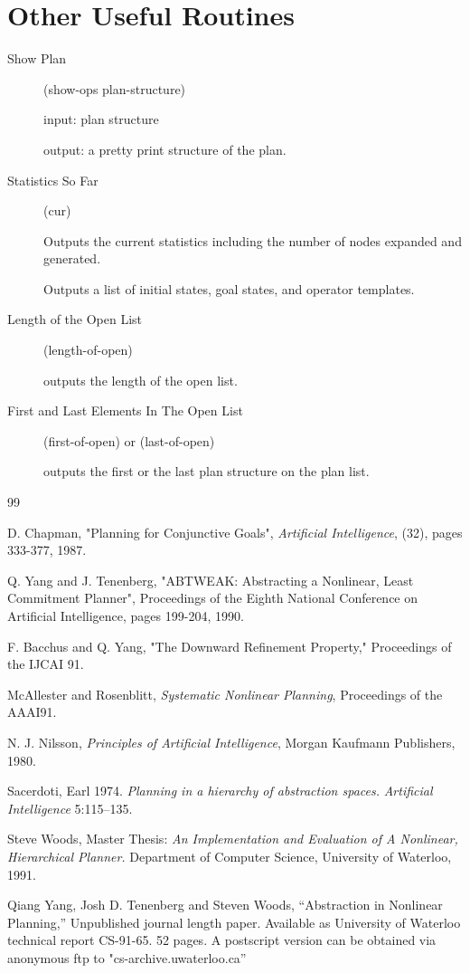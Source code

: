 \section{Other Useful Routines}
\begin{description}
\item[Show Plan]
(show-ops  plan-structure)

input: plan structure

output: a pretty print structure of the plan.

\item[Statistics So Far]
(cur)

Outputs the current statistics including the number of nodes expanded
and generated.

Outputs a list of initial states, goal states, and operator templates.

\item[Length of the Open List]
(length-of-open)

outputs the length of the open list.
\item[First and Last Elements In The Open List]
(first-of-open) or (last-of-open)

outputs the first or the last plan structure on the plan list.
\end{description}

\begin{thebibliography}{99}

D. Chapman, "Planning for Conjunctive Goals", {\em Artificial
Intelligence}, (32), pages 333-377, 1987.

Q. Yang and J. Tenenberg, "ABTWEAK: Abstracting a Nonlinear, Least
Commitment Planner", Proceedings of the Eighth National Conference on
Artificial Intelligence, pages 199-204, 1990.

F. Bacchus and Q. Yang, "The Downward Refinement Property," 
Proceedings of the IJCAI 91.

McAllester and Rosenblitt, {\em Systematic Nonlinear Planning},
Proceedings of the AAAI91.

N. J. Nilsson, {\em Principles of Artificial Intelligence}, Morgan
Kaufmann Publishers, 1980.

Sacerdoti, Earl 1974.
 {\em Planning in a hierarchy of abstraction spaces.}
 {\em Artificial Intelligence} 5:115--135.

Steve Woods, Master Thesis: {\em An Implementation and Evaluation of A
Nonlinear, Hierarchical Planner.} Department of Computer Science,
University of Waterloo, 1991.

Qiang Yang, Josh D. Tenenberg and Steven Woods, ``Abstraction in
Nonlinear Planning,'' Unpublished journal length paper. Available as University
of Waterloo technical report CS-91-65. 52 pages.  A postscript version can be
obtained via anonymous ftp to "cs-archive.uwaterloo.ca''    

\end{thebibliography}


